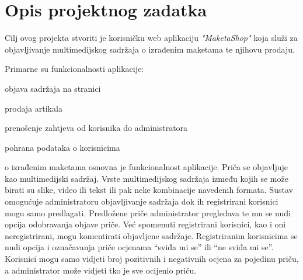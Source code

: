 \chapter{Opis projektnog zadatka}

		Cilj ovog projekta stvoriti je korisničku web aplikaciju \textit{"MaketaShop"} koja služi za objavljivanje multimedijskog sadržaja o izrađenim maketama te njihovu prodaju.
		
		Primarne su funkcionalnosti aplikacije: 
		\begin{packed_item}
			
			\item  objava sadržaja na stranici
			\item  prodaja artikala
			\item  prenošenje zahtjeva od korisnika do administratora
			\item  pohrana podataka o korisnicima
			
		\end{packed_item}
		
		
		 o izrađenim maketama osnovna je funkcionalnost aplikacije. Priča se objavljuje kao multimedijski sadržaj. Vrste multimedijskog sadržaja između kojih se može birati su slike, video ili tekst ili pak neke kombinacije navedenih formata. Sustav omogućuje administratoru objavljivanje sadržaja dok ih registrirani korisnici mogu samo predlagati. Predložene priče administrator pregledava te mu se nudi opcija odobravanja objave priče. Već spomenuti registrirani korisnici, kao i oni neregistrirani, mogu komentirati objavljene sadržaje. Registriranim korisnicima se nudi opcija i označavanja priče ocjenama “sviđa mi se” ili “ne sviđa mi se”. Korisnici mogu samo vidjeti broj pozitivnih i negativnih ocjena za pojedinu priču, a administrator može vidjeti tko je sve ocijenio priču.
		
